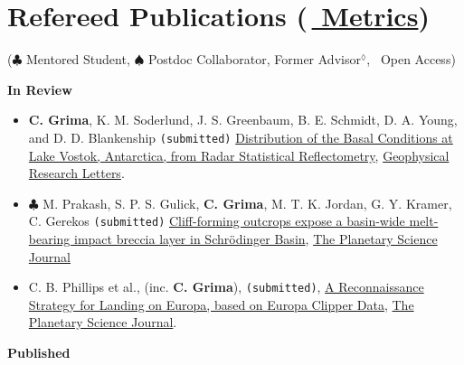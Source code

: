 \section*{Refereed Publications (\href{https://scholar.google.com/citations?user=kaUVku0AAAAJ&hl=fr}{\aiGoogleScholar $\,$ Metrics})}

($\clubsuit$ Mentored Student, $\spadesuit$ Postdoc Collaborator, Former Advisor$^\lozenge$, \aiOpenAccessSquare $\,$ Open Access)
\vspace{1em}


\textbf{In Review}
\begin{itemize}


\item
  \textbf{C. Grima}, K. M. Soderlund, J. S. Greenbaum, B. E. Schmidt, D. A. Young, and D. D. Blankenship \texttt{(submitted)} \href{}{Distribution of the Basal Conditions at Lake Vostok, Antarctica, from Radar Statistical Reflectometry}, \ul{Geophysical Research Letters}.

\item
  $\clubsuit$ M. Prakash, S. P. S. Gulick, \textbf{C. Grima}, M. T. K. Jordan, G. Y. Kramer, C. Gerekos \texttt{(submitted)} \href{}{Cliff-forming outcrops expose a basin-wide melt-bearing impact breccia layer in Schrödinger Basin}, \ul{The Planetary Science Journal}

\item
  C. B. Phillips et al., (inc. \textbf{C. Grima}), \texttt{(submitted)}, \href{}{A Reconnaissance Strategy for Landing on Europa, based on Europa Clipper Data}, \ul{The Planetary Science Journal}. 


\end{itemize}


\textbf{Published}

